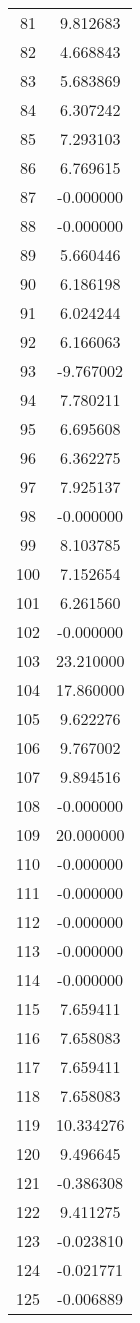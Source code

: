 \documentclass[12pt]{article}
\begin{document}
\begin{longtable}{@{}cc@{}}
81 & 9.812683 \\
82 & 4.668843 \\
83 & 5.683869 \\
84 & 6.307242 \\
85 & 7.293103 \\
86 & 6.769615 \\
87 & -0.000000 \\
88 & -0.000000 \\
89 & 5.660446 \\
90 & 6.186198 \\
91 & 6.024244 \\
92 & 6.166063 \\
93 & -9.767002 \\
94 & 7.780211 \\
95 & 6.695608 \\
96 & 6.362275 \\
97 & 7.925137 \\
98 & -0.000000 \\
99 & 8.103785 \\
100 & 7.152654 \\
101 & 6.261560 \\
102 & -0.000000 \\
103 & 23.210000 \\
104 & 17.860000 \\
105 & 9.622276 \\
106 & 9.767002 \\
107 & 9.894516 \\
108 & -0.000000 \\
109 & 20.000000 \\
110 & -0.000000 \\
111 & -0.000000 \\
112 & -0.000000 \\
113 & -0.000000 \\
114 & -0.000000 \\
115 & 7.659411 \\
116 & 7.658083 \\
117 & 7.659411 \\
118 & 7.658083 \\
119 & 10.334276 \\
120 & 9.496645 \\
121 & -0.386308 \\
122 & 9.411275 \\
123 & -0.023810 \\
124 & -0.021771 \\
125 & -0.006889 \\

\end{longtable}
\end{document}
